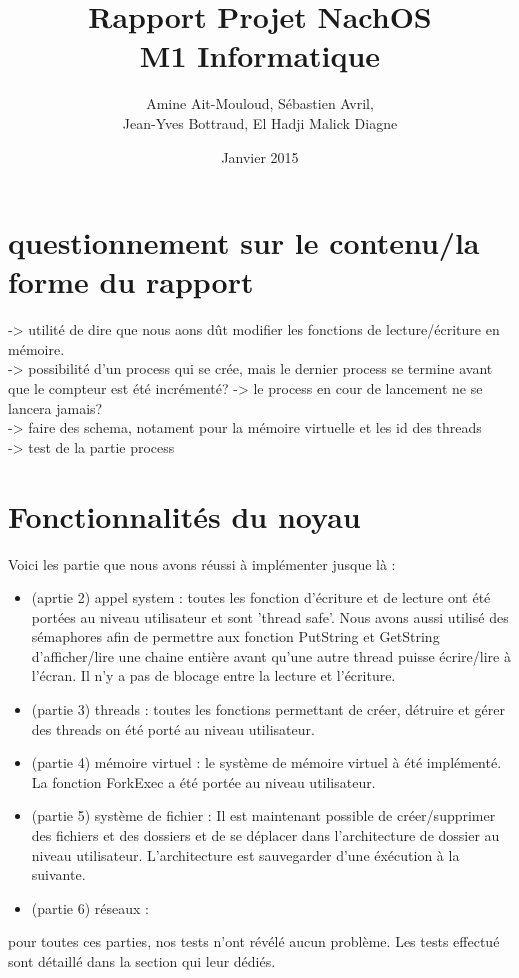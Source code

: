 \documentclass{article}
\begin{document}
\title {Rapport Projet NachOS \\ M1 Informatique}
\author{Amine Ait-Mouloud, Sébastien Avril,\\ Jean-Yves Bottraud, El Hadji Malick Diagne}
\date{Janvier 2015}
\maketitle

\section{questionnement sur le contenu/la forme du rapport}
	-> utilité de dire que nous aons dût modifier les fonctions de lecture/écriture en mémoire.
	\\ -> possibilité d'un process qui se crée, mais le dernier process se termine avant que le compteur est été incrémenté? -> le process en cour de lancement ne se lancera jamais?
	\\ -> faire des schema, notament pour la mémoire virtuelle et les id des threads
	\\ -> test de la partie process

\tableofcontents{}
\newpage
\section{Fonctionnalités du noyau}
	Voici les partie que nous avons réussi à implémenter jusque là :
	\begin{itemize}
		\item (aprtie 2) appel system : toutes les fonction d'écriture et de lecture ont été portées au niveau utilisateur et sont 'thread safe'. Nous avons aussi utilisé des sémaphores afin de permettre aux fonction PutString et GetString d'afficher/lire une chaine entière avant qu'une autre thread puisse écrire/lire à l'écran. Il n'y a pas de blocage entre la lecture et l'écriture.
		\item (partie 3) threads : toutes les fonctions permettant de créer, détruire et gérer des threads on été porté au niveau utilisateur.
		\item (partie 4) mémoire virtuel : le système de mémoire virtuel à été implémenté. La fonction ForkExec a été portée au niveau utilisateur.
		\item (partie 5) système de fichier : Il est maintenant possible de créer/supprimer des fichiers et des dossiers et de se déplacer dans l'architecture de dossier au niveau utilisateur. L'architecture est sauvegarder d'une éxécution à la suivante.
		\item (partie 6) réseaux : 
	\end{itemize}
	pour toutes ces parties, nos tests n'ont révélé aucun problème. Les tests effectué sont détaillé dans la section qui leur dédiés.
\end{document}
